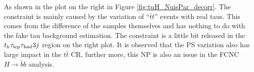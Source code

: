 As shown in the plot on the right in Figure \ref{fig:tuH_NuisPar_decorr}. The constraint is mainly caused by the variation of ``$\bar{t}t$'' events with real taus.
This comes from the difference of the samples themselves and has nothing to do with the fake tau background estimation. The constraint is a little bit released in the $t_h\tau_\text{lep}{}\tau_\text{had} 3j$ region on the right plot. It is observed that the PS variation also has large impact in the $t\bar{t}$ CR, further more, this NP is also an issue in the FCNC $H\to \bar{b}b$ analysis.





